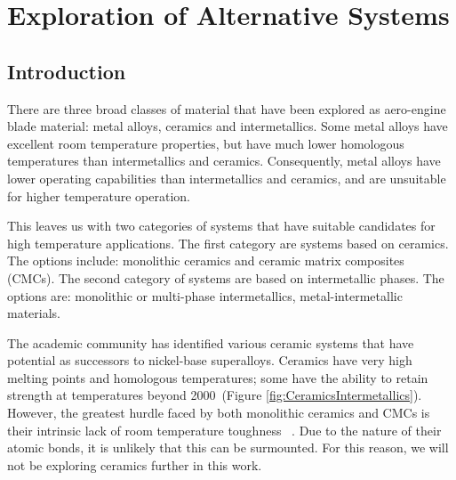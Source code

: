 \chapter{Exploration of Alternative Systems}
\section{Introduction}

There are three broad classes of material that have been explored as aero-engine blade material: metal alloys, ceramics and intermetallics.  Some metal alloys have excellent room temperature properties, but have much lower homologous temperatures than intermetallics and ceramics. Consequently, metal alloys have lower operating capabilities than intermetallics and ceramics, and are unsuitable for higher temperature operation.  

This leaves us with two categories of systems that have suitable candidates for high temperature applications. The first category are systems based on ceramics. The options include: monolithic ceramics and ceramic matrix composites (CMCs). The second category of systems are based on intermetallic phases. The options are: monolithic or multi-phase intermetallics, metal-intermetallic materials. 

The academic community has identified various ceramic systems that have potential as successors to nickel-base superalloys.  Ceramics have very high melting points and homologous temperatures; some have the ability to retain strength at temperatures beyond 2000\celsius\ (Figure \ref{fig:CeramicsIntermetallics}). However, the greatest hurdle faced by both monolithic ceramics and CMCs is their intrinsic lack of room temperature toughness ~\cite{evans80}.  Due to the nature of their atomic bonds, it is unlikely that this can be surmounted. For this reason, we will not be exploring ceramics further in this work.

